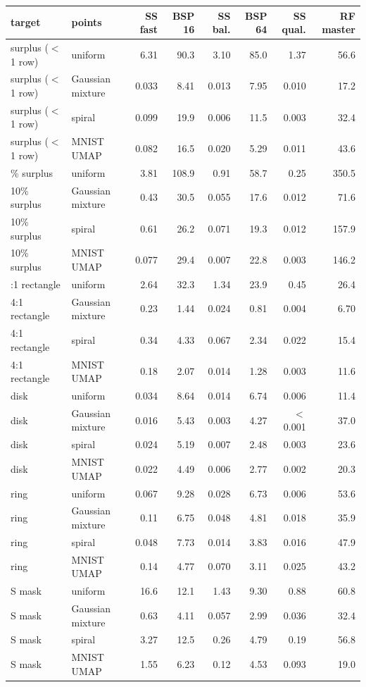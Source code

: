 \begin{tabular}{llrrrrrr}
\toprule
target & points & SS fast & BSP 16 & SS bal. & BSP 64 & SS qual. & RF master \\
\midrule
surplus ($<$1 row) & uniform & 6.31 & 90.3 & 3.10 & 85.0 & 1.37 & 56.6 \\
surplus ($<$1 row) & Gaussian mixture & 0.033 & 8.41 & 0.013 & 7.95 & 0.010 & 17.2 \\
surplus ($<$1 row) & spiral & 0.099 & 19.9 & 0.006 & 11.5 & 0.003 & 32.4 \\
surplus ($<$1 row) & MNIST UMAP & 0.082 & 16.5 & 0.020 & 5.29 & 0.011 & 43.6 \\
\addlinespace
10\% surplus & uniform & 3.81 & 108.9 & 0.91 & 58.7 & 0.25 & 350.5 \\
10\% surplus & Gaussian mixture & 0.43 & 30.5 & 0.055 & 17.6 & 0.012 & 71.6 \\
10\% surplus & spiral & 0.61 & 26.2 & 0.071 & 19.3 & 0.012 & 157.9 \\
10\% surplus & MNIST UMAP & 0.077 & 29.4 & 0.007 & 22.8 & 0.003 & 146.2 \\
\addlinespace
4:1 rectangle & uniform & 2.64 & 32.3 & 1.34 & 23.9 & 0.45 & 26.4 \\
4:1 rectangle & Gaussian mixture & 0.23 & 1.44 & 0.024 & 0.81 & 0.004 & 6.70 \\
4:1 rectangle & spiral & 0.34 & 4.33 & 0.067 & 2.34 & 0.022 & 15.4 \\
4:1 rectangle & MNIST UMAP & 0.18 & 2.07 & 0.014 & 1.28 & 0.003 & 11.6 \\
\addlinespace
disk & uniform & 0.034 & 8.64 & 0.014 & 6.74 & 0.006 & 11.4 \\
disk & Gaussian mixture & 0.016 & 5.43 & 0.003 & 4.27 & $<$0.001 & 37.0 \\
disk & spiral & 0.024 & 5.19 & 0.007 & 2.48 & 0.003 & 23.6 \\
disk & MNIST UMAP & 0.022 & 4.49 & 0.006 & 2.77 & 0.002 & 20.3 \\
\addlinespace
ring & uniform & 0.067 & 9.28 & 0.028 & 6.73 & 0.006 & 53.6 \\
ring & Gaussian mixture & 0.11 & 6.75 & 0.048 & 4.81 & 0.018 & 35.9 \\
ring & spiral & 0.048 & 7.73 & 0.014 & 3.83 & 0.016 & 47.9 \\
ring & MNIST UMAP & 0.14 & 4.77 & 0.070 & 3.11 & 0.025 & 43.2 \\
\addlinespace
S mask & uniform & 16.6 & 12.1 & 1.43 & 9.30 & 0.88 & 60.8 \\
S mask & Gaussian mixture & 0.63 & 4.11 & 0.057 & 2.99 & 0.036 & 32.4 \\
S mask & spiral & 3.27 & 12.5 & 0.26 & 4.79 & 0.19 & 56.8 \\
S mask & MNIST UMAP & 1.55 & 6.23 & 0.12 & 4.53 & 0.093 & 19.0 \\
\bottomrule
\end{tabular}

